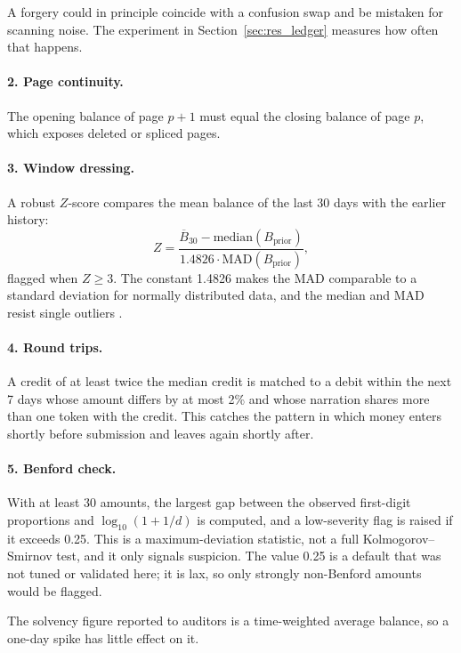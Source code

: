 A forgery could in principle coincide with a confusion swap and be mistaken for scanning noise. The experiment in Section~\ref{sec:res_ledger} measures how often that happens.

\paragraph{2. Page continuity.} The opening balance of page $p+1$ must equal the closing balance of page $p$, which exposes deleted or spliced pages.

\paragraph{3. Window dressing.} A robust $Z$-score compares the mean balance of the last 30 days with the earlier history:
\begin{equation}
Z=\frac{\overline{B}_{30}-\mathrm{median}(B_{\text{prior}})}{1.4826\cdot\mathrm{MAD}(B_{\text{prior}})},
\end{equation}
flagged when $Z\ge 3$. The constant 1.4826 makes the MAD comparable to a standard deviation for normally distributed data, and the median and MAD resist single outliers \cite{rousseeuw1993alternatives}.

\paragraph{4. Round trips.} A credit of at least twice the median credit is matched to a debit within the next 7 days whose amount differs by at most 2\% and whose narration shares more than one token with the credit. This catches the pattern in which money enters shortly before submission and leaves again shortly after.

\paragraph{5. Benford check.} With at least 30 amounts, the largest gap between the observed first-digit proportions and $\log_{10}(1+1/d)$ \cite{benford1938law,nigrini2012benford} is computed, and a low-severity flag is raised if it exceeds 0.25. This is a maximum-deviation statistic, not a full Kolmogorov--Smirnov test, and it only signals suspicion. The value 0.25 is a default that was not tuned or validated here; it is lax, so only strongly non-Benford amounts would be flagged.

The solvency figure reported to auditors is a time-weighted average balance, so a one-day spike has little effect on it.

